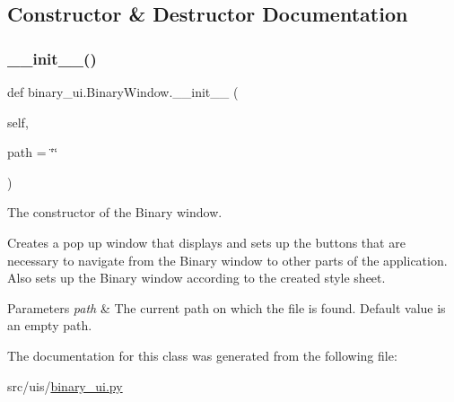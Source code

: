 \subsection{Constructor \& Destructor Documentation}
\mbox{\label{classbinary__ui_1_1_binary_window_a2bc9146b516f338d24aa00087b8736bf}} 
\subsubsection{\texorpdfstring{\+\_\+\+\_\+init\+\_\+\+\_\+()}{\_\_init\_\_()}}
{\footnotesize\ttfamily def binary\+\_\+ui.\+Binary\+Window.\+\_\+\+\_\+init\+\_\+\+\_\+ (\begin{DoxyParamCaption}\item[{}]{self,  }\item[{}]{path = {\ttfamily \char`\"{}\char`\"{}} }\end{DoxyParamCaption})}



The constructor of the Binary window. 

Creates a pop up window that displays and sets up the buttons that are necessary to navigate from the Binary window to other parts of the application. Also sets up the Binary window according to the created style sheet. 
\begin{DoxyParams}{Parameters}
{\em path} & The current path on which the file is found. Default value is an empty path. \\
\hline
\end{DoxyParams}


The documentation for this class was generated from the following file\+:\begin{DoxyCompactItemize}
\item 
src/uis/\hyperlink{binary__ui_8py}{binary\+\_\+ui.\+py}\end{DoxyCompactItemize}
